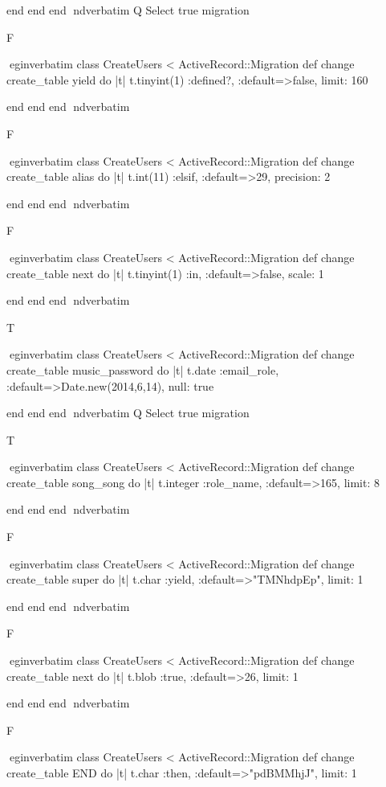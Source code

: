     end 
  end 
end
nd{verbatim}
Q
 Select true migration

F

egin{verbatim}
 class CreateUsers < ActiveRecord::Migration 
  def change 
    create_table yield do |t| 
      t.tinyint(1) :defined?, :default=>false, limit: 160
    
    end 
  end 
end
nd{verbatim}

F

egin{verbatim}
 class CreateUsers < ActiveRecord::Migration 
  def change 
    create_table alias do |t| 
      t.int(11) :elsif, :default=>29, precision: 2
    
    end 
  end 
end
nd{verbatim}

F

egin{verbatim}
 class CreateUsers < ActiveRecord::Migration 
  def change 
    create_table next do |t| 
      t.tinyint(1) :in, :default=>false, scale: 1
    
    end 
  end 
end
nd{verbatim}

T

egin{verbatim}
 class CreateUsers < ActiveRecord::Migration 
  def change 
    create_table music_password do |t| 
      t.date :email_role, :default=>Date.new(2014,6,14), null: true
    
    end 
  end 
end
nd{verbatim}
Q
 Select true migration

T

egin{verbatim}
 class CreateUsers < ActiveRecord::Migration 
  def change 
    create_table song_song do |t| 
      t.integer :role_name, :default=>165, limit: 8
    
    end 
  end 
end
nd{verbatim}

F

egin{verbatim}
 class CreateUsers < ActiveRecord::Migration 
  def change 
    create_table super do |t| 
      t.char :yield, :default=>"TMNhdpEp", limit: 1
    
    end 
  end 
end
nd{verbatim}

F

egin{verbatim}
 class CreateUsers < ActiveRecord::Migration 
  def change 
    create_table next do |t| 
      t.blob :true, :default=>26, limit: 1
    
    end 
  end 
end
nd{verbatim}

F

egin{verbatim}
 class CreateUsers < ActiveRecord::Migration 
  def change 
    create_table END do |t| 
      t.char :then, :default=>"pdBMMhjJ", limit: 1
    
